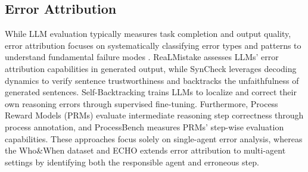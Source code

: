 \documentclass{article}
\begin{document}
\subsection{Error Attribution}
While LLM evaluation typically measures task completion and output quality, error attribution focuses on systematically classifying error types and patterns to understand fundamental failure modes \cite{xu2025diagnosing, yin2022seq2seq, jiang2023tigerscore, ladhak2022contrastive}. ReaLMistake \cite{kamoi2024evaluating} assesses LLMs' error attribution capabilities in generated output, while SynCheck \cite{wu2024synchronous} leverages decoding dynamics to verify sentence trustworthiness and backtracks the unfaithfulness of generated sentences. Self-Backtracking \cite{yang2025step} trains LLMs to localize and correct their own reasoning errors through supervised fine-tuning. Furthermore, Process Reward Models (PRMs) \cite{lightman2023let} evaluate intermediate reasoning step correctness through process annotation, and ProcessBench \cite{zheng2024processbench} measures PRMs' step-wise evaluation capabilities. These approaches focus solely on single-agent error analysis, whereas the Who\&When dataset \cite{zhang2025agent} and ECHO extends error attribution to multi-agent settings by identifying both the responsible agent and erroneous step.
\end{document}
